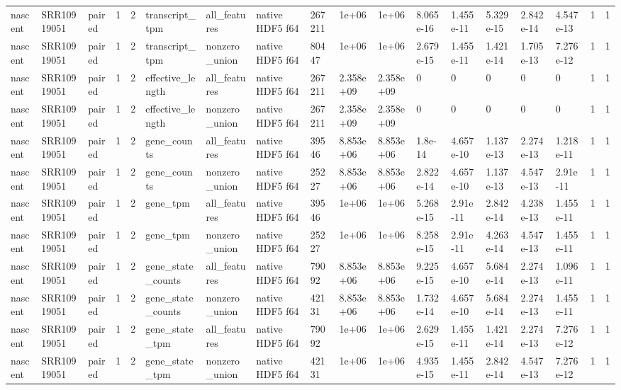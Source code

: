 \begin{tabular}{llllllllllllllllll}
nascent & SRR10919051 & paired & 1 & 2 & transcript\_tpm & all\_features & native HDF5 f64 & 267211 & 1e+06 & 1e+06 & 8.065e-16 & 1.455e-11 & 5.329e-15 & 2.842e-14 & 4.547e-13 & 1 & 1 \\
nascent & SRR10919051 & paired & 1 & 2 & transcript\_tpm & nonzero\_union & native HDF5 f64 & 80447 & 1e+06 & 1e+06 & 2.679e-15 & 1.455e-11 & 1.421e-14 & 1.705e-13 & 7.276e-12 & 1 & 1 \\
nascent & SRR10919051 & paired & 1 & 2 & effective\_length & all\_features & native HDF5 f64 & 267211 & 2.358e+09 & 2.358e+09 & 0 & 0 & 0 & 0 & 0 & 1 & 1 \\
nascent & SRR10919051 & paired & 1 & 2 & effective\_length & nonzero\_union & native HDF5 f64 & 267211 & 2.358e+09 & 2.358e+09 & 0 & 0 & 0 & 0 & 0 & 1 & 1 \\
nascent & SRR10919051 & paired & 1 & 2 & gene\_counts & all\_features & native HDF5 f64 & 39546 & 8.853e+06 & 8.853e+06 & 1.8e-14 & 4.657e-10 & 1.137e-13 & 2.274e-13 & 1.218e-11 & 1 & 1 \\
nascent & SRR10919051 & paired & 1 & 2 & gene\_counts & nonzero\_union & native HDF5 f64 & 25227 & 8.853e+06 & 8.853e+06 & 2.822e-14 & 4.657e-10 & 1.137e-13 & 4.547e-13 & 2.91e-11 & 1 & 1 \\
nascent & SRR10919051 & paired & 1 & 2 & gene\_tpm & all\_features & native HDF5 f64 & 39546 & 1e+06 & 1e+06 & 5.268e-15 & 2.91e-11 & 2.842e-14 & 4.238e-13 & 1.455e-11 & 1 & 1 \\
nascent & SRR10919051 & paired & 1 & 2 & gene\_tpm & nonzero\_union & native HDF5 f64 & 25227 & 1e+06 & 1e+06 & 8.258e-15 & 2.91e-11 & 4.263e-14 & 4.547e-13 & 1.455e-11 & 1 & 1 \\
nascent & SRR10919051 & paired & 1 & 2 & gene\_state\_counts & all\_features & native HDF5 f64 & 79092 & 8.853e+06 & 8.853e+06 & 9.225e-15 & 4.657e-10 & 5.684e-14 & 2.274e-13 & 1.096e-11 & 1 & 1 \\
nascent & SRR10919051 & paired & 1 & 2 & gene\_state\_counts & nonzero\_union & native HDF5 f64 & 42131 & 8.853e+06 & 8.853e+06 & 1.732e-14 & 4.657e-10 & 5.684e-14 & 2.274e-13 & 1.455e-11 & 1 & 1 \\
nascent & SRR10919051 & paired & 1 & 2 & gene\_state\_tpm & all\_features & native HDF5 f64 & 79092 & 1e+06 & 1e+06 & 2.629e-15 & 1.455e-11 & 1.421e-14 & 2.274e-13 & 7.276e-12 & 1 & 1 \\
nascent & SRR10919051 & paired & 1 & 2 & gene\_state\_tpm & nonzero\_union & native HDF5 f64 & 42131 & 1e+06 & 1e+06 & 4.935e-15 & 1.455e-11 & 2.842e-14 & 4.547e-13 & 7.276e-12 & 1 & 1 \\

\end{tabular}
